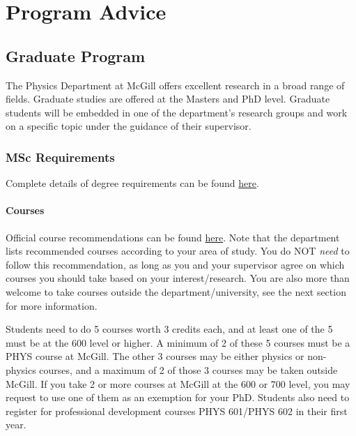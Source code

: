 
\chapter{Program Advice}

\section{Graduate Program}

The Physics Department at McGill offers excellent research in a broad range of fields. Graduate studies are offered at the Masters and PhD level. Graduate students will be embedded in one of the department's research groups and work on a specific topic under the guidance of their supervisor.

    \subsection{MSc Requirements} 

    Complete details of degree requirements can be found \href{https://www.physics.mcgill.ca/grads/requirements.html}{here}.

    \subsubsection{Courses}

    Official course recommendations can be found \href{https://www.physics.mcgill.ca/grads/courses.html}{here}. Note that the department lists recommended courses according to your area of study. You do NOT \textit{need} to follow this recommendation, as long as you and your supervisor agree on which courses you should take based on your interest/research. You are also more than welcome to take courses outside the department/university, see the next section for more information.

    Students need to do 5 courses worth 3 credits each, and at least one of the 5 must be at the 600 level or higher. A minimum of 2 of these 5 courses must be a PHYS course at McGill. The other 3 courses may be either physics or non-physics courses, and a maximum of 2 of those 3 courses may be taken outside McGill. If you take 2 or more courses at McGill at the 600 or 700 level, you may request to use one of them as an exemption for your PhD. Students also need to register for professional development courses PHYS 601/PHYS 602 in their first year. 

